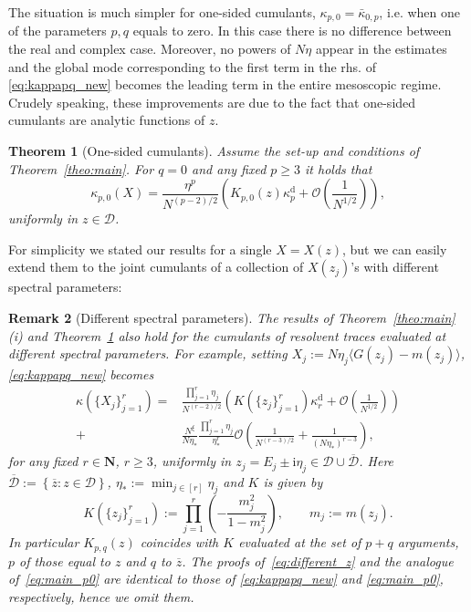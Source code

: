\documentclass[10pt]{amsart}
\newtheorem{theorem}{Theorem}[section]
\newtheorem{remark}[theorem]{Remark}
\numberwithin{equation}{section}
\newcommand{\N}{\mathbf{N}}
\newcommand{\ii}{\mathrm{i}}
\begin{document}
The situation is much simpler for one-sided cumulants, $\kappa_{p,0} = \bar{\kappa}_{0,p}$, i.e. when one of the parameters $p,q$ equals to zero. In this case there is no difference between the real and complex case. Moreover, no powers of $N\eta$ appear in the estimates and the global mode corresponding to the first term in the rhs. of \eqref{eq:kappapq_new} becomes the leading term in the entire mesoscopic regime. Crudely speaking, these improvements are due to the fact that one-sided cumulants are analytic functions of $z$.


\begin{theorem}[One-sided cumulants]\label{theo:main1} Assume the set-up and conditions of Theorem~\ref{theo:main}. For $q=0$ and any fixed $p\ge 3$ it holds that
\begin{equation}
\kappa_{p,0}\left(X\right) = \frac{\eta^p}{N^{(p-2)/2}}\left(K_{p,0}(z)\kappa_p^{\mathrm{d}} + \mathcal{O}\left(\frac{1}{N^{1/2}}\right)\right),
\label{eq:main_p0}
\end{equation}
uniformly in $z\in\mathcal{D}$.
\end{theorem}


For simplicity we stated our results for a single $X=X(z)$, but 
we can easily extend them to the joint cumulants of a collection of $X(z_j)$’s with different spectral parameters:


\begin{remark}[Different spectral parameters]\label{rem:ext} The results of Theorem~\ref{theo:main}(i) and Theorem~\ref{theo:main1} also hold  for the cumulants of resolvent traces evaluated at different spectral parameters. For example, setting $X_j:=N\eta_j\langle G(z_j)-m(z_j)\rangle$, \eqref{eq:kappapq_new} becomes
\begin{equation}
\begin{split}
\kappa\left(\big\lbrace X_j\big\rbrace_{j=1}^r\right) =& \frac{\prod_{j=1}^r \eta_j}{N^{(r-2)/2}}\left(K\left(\{z_j\}_{j=1}^r\right)\kappa_{r}^{\mathrm{d}} + \mathcal{O}\left(\frac{1}{N^{1/2}}\right)\right)\\
 + &\frac{N^\xi}{N\eta_*}\frac{\prod_{j=1}^r \eta_j}{\eta_*^r}\mathcal{O}\left(\frac{1}{N^{(r-3)/2}}+\frac{1}{(N\eta_*)^{r-3}}\right),
\end{split}
\label{eq:different_z}
\end{equation}
for any fixed $r\in \N$, $r\ge 3$, uniformly in $z_j=E_j\pm \ii\eta_j\in \mathcal{D}\cup \overline{\mathcal{D}}$. Here $\overline{\mathcal{D}}:=\left\lbrace\overline{z}:z\in\mathcal{D}\right\rbrace$, $\eta_*:=\min_{j\in [r]} \eta_j$ and $K$ is given by
\begin{equation}
K\left(\{z_j\}_{j=1}^r\right):=\prod_{j=1}^r \left(-\frac{m_j^2}{1-m_j^2}\right),\qquad m_j:=m(z_j).
\end{equation}
In particular $K_{p,q}(z)$ coincides with $K$ evaluated at the set of $p+q$ arguments, $p$ of those equal to $z$ and $q$ to $\overline{z}$. The proofs of~\eqref{eq:different_z} and the analogue of~\eqref{eq:main_p0} are identical to those of \eqref{eq:kappapq_new} and \eqref{eq:main_p0}, respectively, hence we omit them.
\end{remark}
\end{document}

